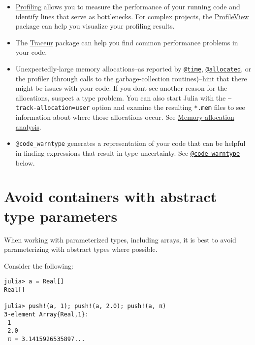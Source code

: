 \begin{itemize}
\item \href{@ref}{Profiling} allows you to measure the performance of your running code and identify lines that serve as bottlenecks. For complex projects, the \href{https://github.com/timholy/ProfileView.jl}{ProfileView} package can help you visualize your profiling results.


\item The \href{https://github.com/JunoLab/Traceur.jl}{Traceur} package can help you find common performance problems in your code.


\item Unexpectedly-large memory allocations–as reported by \hyperlink{8029752041511656628}{\texttt{@time}}, \hyperlink{5377755456008435782}{\texttt{@allocated}}, or the profiler (through calls to the garbage-collection routines)–hint that there might be issues with your code. If you don{\textquotesingle}t see another reason for the allocations, suspect a type problem.  You can also start Julia with the \texttt{--track-allocation=user} option and examine the resulting \texttt{*.mem} files to see information about where those allocations occur. See \href{@ref}{Memory allocation analysis}.


\item \texttt{@code\_warntype} generates a representation of your code that can be helpful in finding expressions that result in type uncertainty. See \hyperlink{8092893264277772840}{\texttt{@code\_warntype}} below.

\end{itemize}


\hypertarget{12159424404022697469}{}


\section{Avoid containers with abstract type parameters}



When working with parameterized types, including arrays, it is best to avoid parameterizing with abstract types where possible.



Consider the following:




\begin{verbatim}
julia> a = Real[]
Real[]

julia> push!(a, 1); push!(a, 2.0); push!(a, π)
3-element Array{Real,1}:
 1
 2.0
 π = 3.1415926535897...
\end{verbatim}



